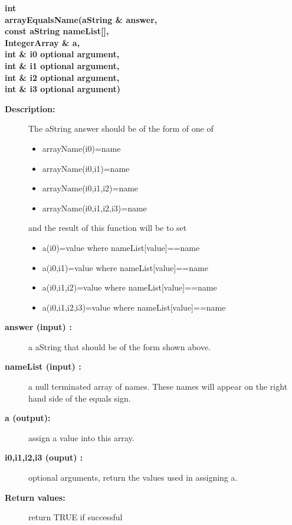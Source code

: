 \begin{flushleft} \textbf{%
int  \\ 
\settowidth{\NameListIncludeArgIndent}{arrayEqualsName(}%
arrayEqualsName(aString \& answer, \\ 
\hspace{\NameListIncludeArgIndent}const aString nameList[], \\ 
\hspace{\NameListIncludeArgIndent}IntegerArray \& a, \\ 
\hspace{\NameListIncludeArgIndent}int \& i0 optional argument,\\ 
\hspace{\NameListIncludeArgIndent}int \& i1 optional argument,\\ 
\hspace{\NameListIncludeArgIndent}int \& i2 optional argument,\\ 
\hspace{\NameListIncludeArgIndent}int \& i3   optional argument)
}\end{flushleft}
\begin{description}
\item[{\bf Description:}] 
    The aString answer should be of the form of one of
    \begin{itemize}
       \item arrayName(i0)=name
       \item arrayName(i0,i1)=name
       \item arrayName(i0,i1,i2)=name
       \item arrayName(i0,i1,i2,i3)=name
    \end{itemize}
   and the result of this function will be to set
    \begin{itemize}
       \item a(i0)=value where nameList[value]==name
       \item a(i0,i1)=value where nameList[value]==name
       \item a(i0,i1,i2)=value where nameList[value]==name
       \item a(i0,i1,i2,i3)=value where nameList[value]==name
    \end{itemize}

    
\item[{\bf answer (input) :}]  a aString that should be of the form shown above.
\item[{\bf nameList (input) :}]  a null terminated array of names. These names will
    appear on the right hand side of the equals sign.
\item[{\bf a (output):}]  assign a value into this array.
\item[{\bf i0,i1,i2,i3 (ouput) :}]  optional arguments, return the values used in assigning a.
\item[{\bf Return values:}]  return TRUE if successful
\end{description}
